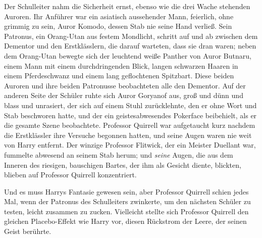 Der Schulleiter nahm die Sicherheit ernst, ebenso wie die drei Wache stehenden Auroren. Ihr Anführer war ein asiatisch aussehender Mann, feierlich, ohne grimmig zu sein, Auror Komodo, dessen Stab nie seine Hand verließ. Sein Patronus, ein Orang-Utan aus festem Mondlicht, schritt auf und ab zwischen dem Dementor und den Erstklässlern, die darauf warteten, dass sie dran waren; neben dem Orang-Utan bewegte sich der leuchtend weiße Panther von Auror Butnaru, einem Mann mit einem durchdringenden Blick, langen schwarzen Haaren in einem Pferdeschwanz und einem lang geflochtenen Spitzbart. Diese beiden Auroren und ihre beiden Patronusse beobachteten alle den Dementor. Auf der anderen Seite der Schüler ruhte sich Auror Goryanof aus, groß und dünn und blass und unrasiert, der sich auf einem Stuhl zurücklehnte, den er ohne Wort und Stab beschworen hatte, und der ein geistesabwesendes Pokerface beibehielt, als er die gesamte Szene beobachtete. Professor Quirrell war aufgetaucht kurz nachdem die Erstklässler ihre Versuche begonnen hatten, und seine Augen waren nie weit von Harry entfernt. Der winzige Professor Flitwick, der ein Meister Duellant war, fummelte abwesend an seinem Stab herum; und \emph{seine} Augen, die aus dem Inneren des riesigen, bauschigen Bartes, der ihm als Gesicht diente, blickten, blieben auf Professor Quirrell konzentriert.

Und es muss Harrys Fantasie gewesen sein, aber Professor Quirrell schien jedes Mal, wenn der Patronus des Schulleiters zwinkerte, um den nächsten Schüler zu testen, leicht zusammen zu zucken. Vielleicht stellte sich Professor Quirrell den gleichen Placebo-Effekt wie Harry vor, diesen Rückstrom der Leere, der seinen Geist berührte.

